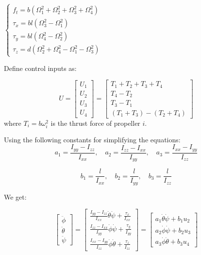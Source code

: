 $
\left\{
\begin{array}{l}
  f_{t}=b\left(\Omega_{1}^{2}+\Omega_{2}^{2}+\Omega_{3}^{2}+\Omega_{4}^{2}\right) \\
  \tau_{x}=b l\left(\Omega_{3}^{2}-\Omega_{1}^{2}\right) \\
  \tau_{y}=b l\left(\Omega_{4}^{2}-\Omega_{2}^{2}\right) \\
  \tau_{z}=d\left(\Omega_{2}^{2}+\Omega_{4}^{2}-\Omega_{1}^{2}-\Omega_{3}^{2}\right)
\end{array}
\right.
$

Define control inputs as:

$$U=\left[ \begin{array}{l}{U_{1}} \\ {U_{2}} \\ {U_{3}} \\ {U_{4}}\end{array}\right]=\left[ \begin{array}{c}{T_{1}+T_{2}+T_{3}+T_{4}} \\ {T_{4}-T_{2}} \\ {T_{3}-T_{1}} \\ {\left(T_{1}+T_{3}\right)-\left(T_{2}+T_{4}\right)}\end{array}\right]$$
where $T_i=b\omega_{i}^2$ is the thrust force of propeller $i$.

  Using the following constants for simplifying the equations:
$$a_{1}=\frac{I_{y y}-I_{z z}}{I_{x x}}, \quad a_{2}=\frac{I_{z z}-I_{x x}}{I_{y y}}, \quad a_{3}=\frac{I_{x x}-I_{y y}}{I_{z z}}$$

$$b_{1}=\frac{l}{I_{x x}}, \quad b_{2}=\frac{l}{I_{y y}}, \quad b_{3}=\frac{l}{I_{z z}}$$

We get:

$$
\left[ \begin{array}{l}
\ddot{\phi} \\ \ddot{\theta} \\ \ddot{\psi} 
\end{array} \right] = 
\left[ \begin{array}{l}
\frac{I_{yy}-I_{zz}}{I_{xx}} \dot{\theta} \dot{\psi} + \frac{\tau_{x}}{I_{xx}} \\ 
\frac{I_{zz}-I_{xx}}{I_{yy}} \dot{\phi} \dot{\psi} + \frac{\tau_{y}}{I_{yy}} \\
\frac{I_{xx}-I_{yy}}{I_{zz}} \dot{\phi} \dot{\theta} + \frac{\tau_{z}}{I_{zz}} 
\end{array}\right]
=
\left[ \begin{array}{l}
a_1 \dot{\theta} \dot{\psi} + b_1 u_2 \\ 
a_2 \dot{\phi} \dot{\psi} + b_2 u_3 \\
a_3 \dot{\phi} \dot{\theta} + b_3 u_4
\end{array}\right]
$$

